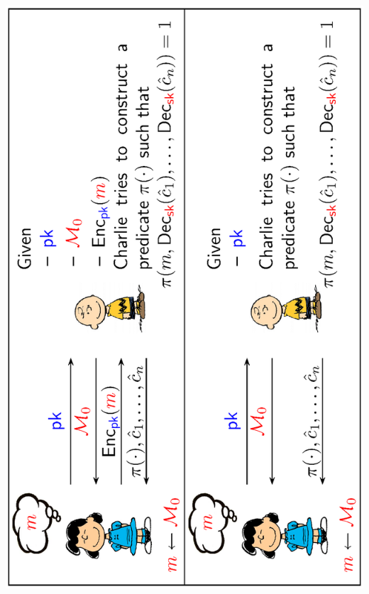 \documentclass[landscape,footrule]{foils}
\begin{document}

\begin{center}
 \includegraphics[scale=0.82, angle=-90, clip, trim=3.5cm 2.5cm 4.0cm 2.5cm]{non-malleability.eps}
\end{center}

\enlargethispage{1cm}
\end{document}

